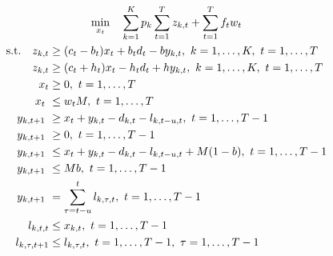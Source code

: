 \documentclass[11pt,a4paper]{article}
\begin{document}
\begin{equation}
\label{eq:final_nw}
\begin{gathered}
\min_{x_{t}} \quad 
\sum\limits_{k=1}^{K}{ p_k \sum\limits_{t=1}^{T}{ z_{k,t} }} + \sum\limits_{t=1}^{T}{f_{t} w_{t} } \\
\begin{aligned}
\textup{s.t.}\quad   z_{k,t}  &\geq (c_t-b_t)x_{t} + b_t d_{t} - b y_{k,t} ,\ k = 1,\dots,K,\  t = 1,\dots,T\\
                   z_{k,t}  &\geq (c_t+h_t)x_{t} - h_t d_{t} + h y_{k,t} ,\ k = 1,\dots,K,\  t = 1,\dots,T  \\
         x_{t} &\geq 0,\  t = 1,\dots,T\\ 
         x_{t}\ &\leq w_{t}M,\  t = 1,\dots,T \\
  y_{k,t+1}\ &\geq x_t + y_{k,t} - d_{k,t} -l_{k, t-u, t},\  t = 1,\dots,T-1\\ 
  y_{k,t+1}\ &\geq 0,\  t = 1,\dots,T-1\\ 
   y_{k,t+1}\ &\leq x_t + y_{k,t} - d_{k,t} -l_{k, t-u, t} + M(1-b) ,\  t = 1,\dots,T-1\\  
   y_{k,t+1}\ &\leq Mb,\  t = 1,\dots,T-1\\ 
    y_{k,t+1}\ &= \sum\limits_{\tau=t-u}^{t}{ l_{k,\tau,t} },\  t = 1,\dots,T-1 \\
    l_{k,t,t} &\leq x_{k,t},\  t = 1,\dots,T-1 \\
    l_{k,\tau,t+1} &\leq l_{k,\tau,t},\  t = 1,\dots,T-1, \ \tau = 1, \dots, T-1 \\
 \end{aligned}
\end{gathered}
\end{equation}
\end{document}
